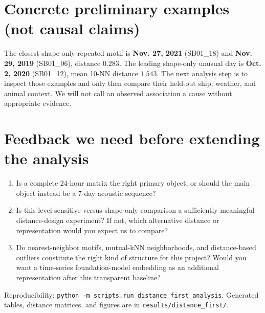 \documentclass[9pt]{article}
\begin{document}
\section*{Concrete preliminary examples (not causal claims)}
The closest shape-only repeated motif is \textbf{Nov. 27, 2021} (SB01\_18) and
\textbf{Nov. 29, 2019} (SB01\_06), distance \(0.283\). The leading shape-only
unusual day is \textbf{Oct. 2, 2020} (SB01\_12), mean 10-NN distance \(1.543\).
The next analysis step is to inspect those examples and only then compare their
held-out ship, weather, and animal context. We will not call an observed
association a cause without appropriate evidence.

\section*{Feedback we need before extending the analysis}
\begin{enumerate}
  \item Is a complete 24-hour matrix the right primary object, or should the
  main object instead be a 7-day acoustic sequence?
  \item Is this level-sensitive versus shape-only comparison a sufficiently
  meaningful distance-design experiment? If not, which alternative distance or
  representation would you expect us to compare?
  \item Do nearest-neighbor motifs, mutual-kNN neighborhoods, and
  distance-based outliers constitute the right kind of structure for this
  project? Would you want a time-series foundation-model embedding as an
  additional representation after this transparent baseline?
\end{enumerate}

\vfill
{\scriptsize Reproducibility: \texttt{python -m scripts.run\_distance\_first\_analysis}. Generated tables, distance matrices, and figures are in \texttt{results/distance\_first/}.}
\end{document}
